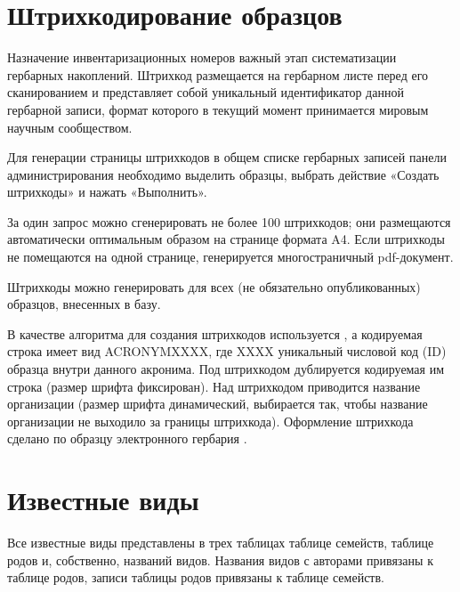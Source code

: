 \documentclass[letterpaper,10pt,russian]{sphinxmanual}
\begin{document}

\ignorespaces 

\section{Штрихкодирование образцов}
\label{\detokenize{main:index-39}}\label{\detokenize{main:id42}}
Назначение инвентаризационных номеров важный этап систематизации
гербарных накоплений.
Штрихкод размещается на гербарном листе перед его сканированием и представляет собой уникальный идентификатор
данной гербарной записи, формат которого в текущий момент принимается мировым научным сообществом.

Для генерации страницы штрихкодов  в общем списке гербарных записей панели
администрирования необходимо выделить образцы,
выбрать действие \textendash{} «Создать штрихкоды» и нажать «Выполнить».

За один запрос можно сгенерировать не более 100 штрихкодов; они размещаются
автоматически оптимальным образом на странице формата A4.
Если штрихкоды не помещаются на одной странице,
генерируется многостраничный pdf-документ.

Штрихкоды можно генерировать для всех (не обязательно опубликованных) образцов, внесенных в базу.

В качестве алгоритма для создания штрихкодов используется ,
а кодируемая строка имеет вид ACRONYMXXXX,  где XXXX \textendash{} уникальный
числовой код (ID) образца внутри данного акронима. Под штрихкодом дублируется
кодируемая им строка (размер шрифта фиксирован). Над штрихкодом приводится название
организации (размер шрифта динамический, выбирается так, чтобы название
организации не выходило за границы штрихкода).
Оформление штрихкода сделано по образцу электронного гербария .


\ignorespaces 

\section{Известные виды}
\label{\detokenize{main:id43}}\label{\detokenize{main:index-40}}
Все известные виды представлены в трех таблицах \textendash{} таблице семейств,
таблице родов и, собственно, названий видов.
Названия видов с авторами привязаны к таблице родов, записи таблицы
родов \textendash{} привязаны к таблице семейств.
\end{document}
